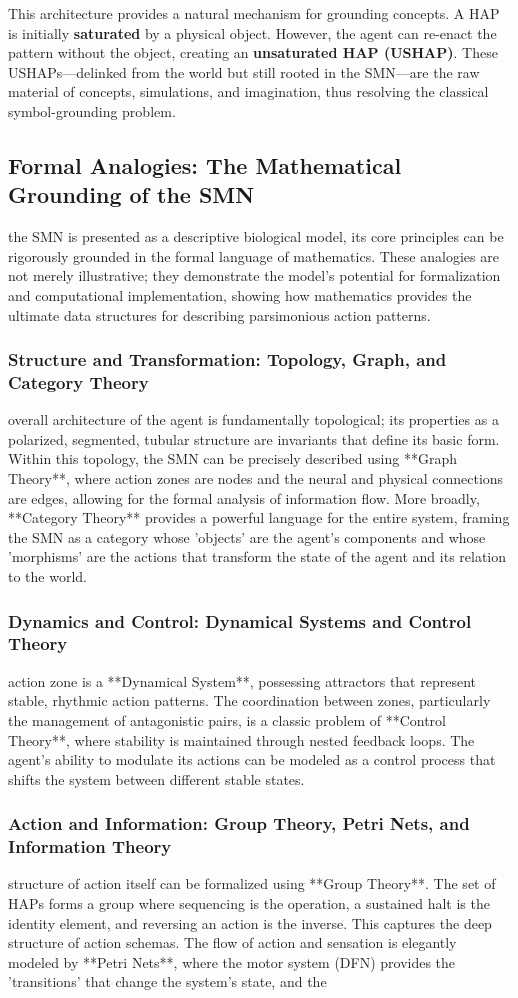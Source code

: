 This architecture provides a natural mechanism for grounding concepts. A HAP is initially \textbf{saturated} by a physical object. However, the agent can re-enact the pattern without the object, creating an \textbf{unsaturated HAP (USHAP)}. These USHAPs—delinked from the world but still rooted in the SMN—are the raw material of concepts, simulations, and imagination, thus resolving the classical symbol-grounding problem.\n\subsection*{Formal Analogies: The Mathematical Grounding of the SMN}\nWhile the SMN is presented as a descriptive biological model, its core principles can be rigorously grounded in the formal language of mathematics. These analogies are not merely illustrative; they demonstrate the model's potential for formalization and computational implementation, showing how mathematics provides the ultimate data structures for describing parsimonious action patterns.\n\n\subsubsection*{Structure and Transformation: Topology, Graph, and Category Theory}\nThe overall architecture of the agent is fundamentally topological; its properties as a polarized, segmented, tubular structure are invariants that define its basic form. Within this topology, the SMN can be precisely described using **Graph Theory**, where action zones are nodes and the neural and physical connections are edges, allowing for the formal analysis of information flow. More broadly, **Category Theory** provides a powerful language for the entire system, framing the SMN as a category whose 'objects' are the agent's components and whose 'morphisms' are the actions that transform the state of the agent and its relation to the world.\n\n\subsubsection*{Dynamics and Control: Dynamical Systems and Control Theory}\nEach action zone is a **Dynamical System**, possessing attractors that represent stable, rhythmic action patterns. The coordination between zones, particularly the management of antagonistic pairs, is a classic problem of **Control Theory**, where stability is maintained through nested feedback loops. The agent's ability to modulate its actions can be modeled as a control process that shifts the system between different stable states.\n\n\subsubsection*{Action and Information: Group Theory, Petri Nets, and Information Theory}\nThe structure of action itself can be formalized using **Group Theory**. The set of HAPs forms a group where sequencing is the operation, a sustained halt is the identity element, and reversing an action is the inverse. This captures the deep structure of action schemas. The flow of action and sensation is elegantly modeled by **Petri Nets**, where the motor system (DFN) provides the 'transitions' that change the system's state, and the 